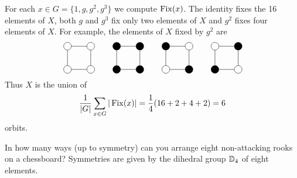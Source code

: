 \begin{optional}
\begin{example}
For each $x\in G=\{1,g,g^2,g^3\}$ we compute $\operatorname{Fix}(x)$. The identity fixes 
the 16 elements of $X$, both 
$g$ and  $g^3$ fix only two elements of $X$ and 
$g^2$ fixes four elements of $X$. For example, 
the elements of $X$ fixed by $g^2$ are 
\[
\begin{tikzpicture}
    \node[shape=circle,draw=black] (A) at (1,0){};
    \node[shape=circle,draw=black] (B) at (1,1){};
    \node[shape=circle,draw=black] (C) at (0,1){}; 
    \node[shape=circle,draw=black] (D) at (0,0){};
    \path [-](A) edge node[left]{} (B);
    \path [-](B) edge node[left]{} (C);
    \path [-](C) edge node[left]{} (D);
    \path [-](D) edge node[left]{} (A);
\end{tikzpicture}
\qquad
\begin{tikzpicture}
    \node[shape=circle,draw=black,fill=black] (A) at (1,0) {};
    \node[shape=circle,draw=black,fill=black] (B) at (1,1) {};
    \node[shape=circle,draw=black,fill=black] (C) at (0,1) {};
    \node[shape=circle,draw=black,fill=black] (D) at (0,0) {};
    \path [-](A) edge node[left]{} (B);
    \path [-](B) edge node[left]{} (C);
    \path [-](C) edge node[left]{} (D);
    \path [-](D) edge node[left]{} (A);
\end{tikzpicture}
\qquad
\begin{tikzpicture}
    \node[shape=circle,draw=black,fill=black] (A) at (1,0) {};
    \node[shape=circle,draw=black] (B) at (1,1) {};
    \node[shape=circle,draw=black,fill=black] (C) at (0,1) {};
    \node[shape=circle,draw=black] (D) at (0,0) {};
    \path [-](A) edge node[left]{} (B);
    \path [-](B) edge node[left]{} (C);
    \path [-](C) edge node[left]{} (D);
    \path [-](D) edge node[left]{} (A);
\end{tikzpicture}
\qquad
\begin{tikzpicture}
    \node[shape=circle,draw=black] (A) at (1,0) {};
    \node[shape=circle,draw=black,fill=black] (B) at (1,1) {};
    \node[shape=circle,draw=black] (C) at (0,1) {};
    \node[shape=circle,draw=black,fill=black] (D) at (0,0) {};
    \path [-](A) edge node[left]{} (B);
    \path [-](B) edge node[left]{} (C);
    \path [-](C) edge node[left]{} (D);
    \path [-](D) edge node[left]{} (A);
\end{tikzpicture}
\]
Thus $X$ is the union of  
\[
\frac{1}{|G|}\sum_{x\in G}|\operatorname{Fix}(x)|=\frac{1}{4}(16+2+4+2)=6
\]
orbits. 
\end{example}

\end{optional}


\begin{bonus}
    In how many ways (up to symmetry) can you
    arrange eight non-attacking rooks on a chessboard? Symmetries 
    are given by the dihedral group $\mathbb{D}_4$ of eight elements.
\end{bonus}


